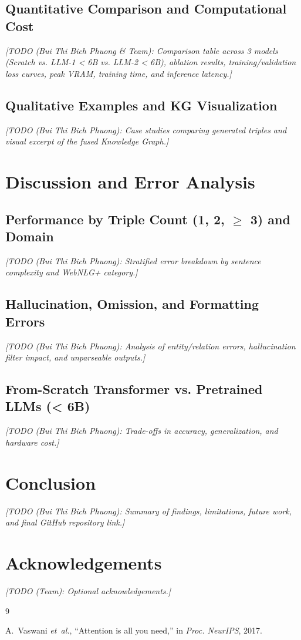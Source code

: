 \documentclass[10pt, a4paper]{article}
\newcommand{\todo}[1]{\par\noindent\textit{[#1]}\par}
\begin{document}
\subsection{Quantitative Comparison and Computational Cost}
\todo{TODO (Bui Thi Bich Phuong \& Team): Comparison table across 3 models (Scratch vs. LLM-1 < 6B vs. LLM-2 < 6B), ablation results, training/validation loss curves, peak VRAM, training time, and inference latency.}

\subsection{Qualitative Examples and KG Visualization}
\todo{TODO (Bui Thi Bich Phuong): Case studies comparing generated triples and visual excerpt of the fused Knowledge Graph.}

\section{Discussion and Error Analysis}

\subsection{Performance by Triple Count (1, 2, \texorpdfstring{$\ge$}{>=} 3) and Domain}
\todo{TODO (Bui Thi Bich Phuong): Stratified error breakdown by sentence complexity and WebNLG+ category.}

\subsection{Hallucination, Omission, and Formatting Errors}
\todo{TODO (Bui Thi Bich Phuong): Analysis of entity/relation errors, hallucination filter impact, and unparseable outputs.}

\subsection{From-Scratch Transformer vs. Pretrained LLMs (< 6B)}
\todo{TODO (Bui Thi Bich Phuong): Trade-offs in accuracy, generalization, and hardware cost.}

\section{Conclusion}
\todo{TODO (Bui Thi Bich Phuong): Summary of findings, limitations, future work, and final GitHub repository link.}

\section*{Acknowledgements}
\todo{TODO (Team): Optional acknowledgements.}


\begin{thebibliography}{9}

A.~Vaswani \emph{et~al.}, ``Attention is all you need,'' in \emph{Proc. NeurIPS}, 2017.

\end{thebibliography}
\end{document}
